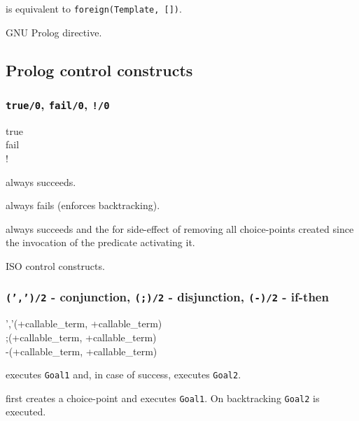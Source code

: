  is equivalent to \texttt{foreign(Template, [])}.

\Portability

GNU Prolog directive.

\subsection{Prolog control constructs}

\subsubsection{\texttt{true/0},
\texttt{fail/0},
\texttt{!/0}}
\label{true/0}

\begin{TemplatesOneCol}
true\\
fail\\
!

\end{TemplatesOneCol}

\Description

 always succeeds.

 always fails (enforces backtracking).

\IdxCCD["!/0]{!} always succeeds and the for side-effect of removing all
choice-points created since the invocation of the predicate activating it.

\PlErrorsNone

\Portability

ISO control constructs.

\subsubsection{\texttt{(',')/2} - conjunction,
\texttt{(;)/2} - disjunction,
\texttt{(-{\gt})/2} - if-then}

\begin{TemplatesOneCol}
','(+callable\_term, +callable\_term)\\
;(+callable\_term, +callable\_term)\\
-{\gt}(+callable\_term, +callable\_term)

\end{TemplatesOneCol}

\Description

 executes \texttt{Goal1} and, in case of
success, executes \texttt{Goal2}.

 first creates a choice-point and executes
\texttt{Goal1}. On backtracking \texttt{Goal2} is executed.

